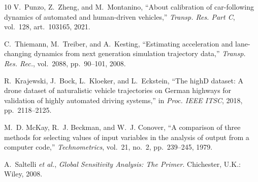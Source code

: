 \documentclass[conference,a4paper]{IEEEtran}
\begin{document}
\begin{thebibliography}{10}
 V.~Punzo, Z.~Zheng, and M.~Montanino, ``About calibration of
car-following dynamics of automated and human-driven vehicles,'' \emph{Transp.
Res. Part C}, vol.~128, art.~103165, 2021.

 C.~Thiemann, M.~Treiber, and A.~Kesting, ``Estimating
acceleration and lane-changing dynamics from next generation simulation
trajectory data,'' \emph{Transp. Res. Rec.}, vol.~2088, pp.~90--101, 2008.

 R.~Krajewski, J.~Bock, L.~Kloeker, and L.~Eckstein, ``The
highD dataset: A drone dataset of naturalistic vehicle trajectories on German
highways for validation of highly automated driving systems,'' in \emph{Proc.
IEEE ITSC}, 2018, pp.~2118--2125.

 M.~D. McKay, R.~J. Beckman, and W.~J. Conover, ``A comparison
of three methods for selecting values of input variables in the analysis of
output from a computer code,'' \emph{Technometrics}, vol.~21, no.~2,
pp.~239--245, 1979.

 A.~Saltelli \emph{et al.}, \emph{Global Sensitivity
Analysis: The Primer}. Chichester, U.K.: Wiley, 2008.

\end{thebibliography}
\end{document}
